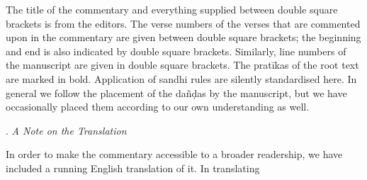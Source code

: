 The title of the commentary and everything supplied between
double square brackets is from the editors. The verse numbers of
the verses that are commented upon in the commentary are given
between double square brackets; the beginning and end is also
indicated by double square brackets. Similarly, line numbers of the
manuscript are given in double square brackets. The pratīkas of the
root text are marked in bold. Application of sandhi rules are silently
standardised here. In general we follow the placement of the dañḍas
by the manuscript, but we have occasionally placed them according
to our own understanding as well.

\vspace{1em}
. \textit{A Note on the Translation}

\vspace{.3em}
\noindent
In order to make the commentary accessible to a broader readership,
we have included a running English translation of it. In translating



\vfill
\pagebreak
